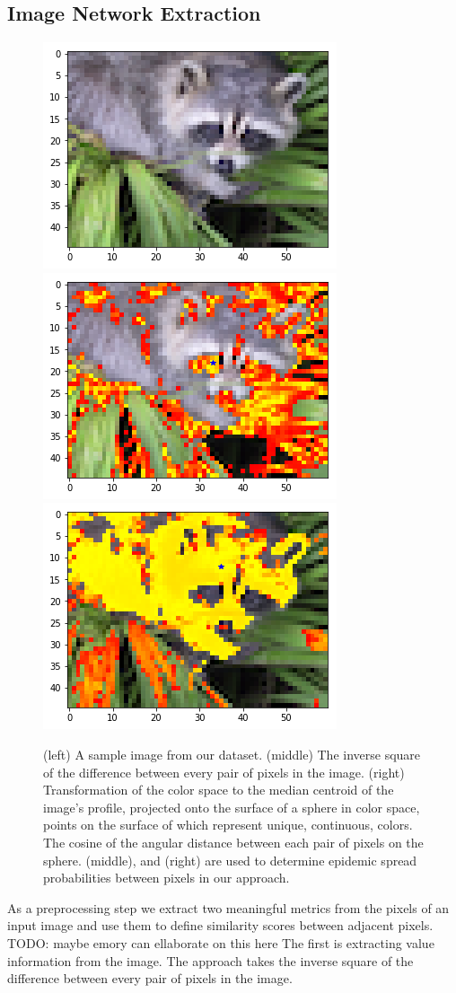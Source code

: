 \documentclass[twocolumn]{article}
\newcommand{\todo}[1]{}
\renewcommand{\todo}[1]{{\color{red} TODO: {#1}}}
\newcommand{\figlab}[1]{\label{fig:#1}}
\begin{document}
\subsection{Image Network Extraction}

\begin{figure}
\centering

\includegraphics[width=0.3\linewidth]{figs/input.png}
\includegraphics[width=0.3\linewidth]{figs/alpha.png}
\includegraphics[width=0.3\linewidth]{figs/beta.png}

\caption{
(left) A sample image from our dataset.
(middle) The inverse square of the difference between every pair of pixels in
the image. 
(right) Transformation of the color space to the median centroid of the image's
profile, projected onto the surface of a sphere in color space, points on the
surface of which represent unique, continuous, colors. The cosine of the angular
distance between each pair of pixels on the sphere.
(middle), and (right) are used to determine epidemic spread probabilities
between pixels in our approach.
}
\figlab{alpha_beta}
\end{figure}

As a preprocessing step we extract two meaningful metrics from the pixels of an
input image and use them to define similarity scores between adjacent pixels.
\todo{maybe emory can ellaborate on this here}
The first is extracting value information from the image.
The approach takes the inverse square of the difference between every pair of
pixels in the image. 
\end{document}
